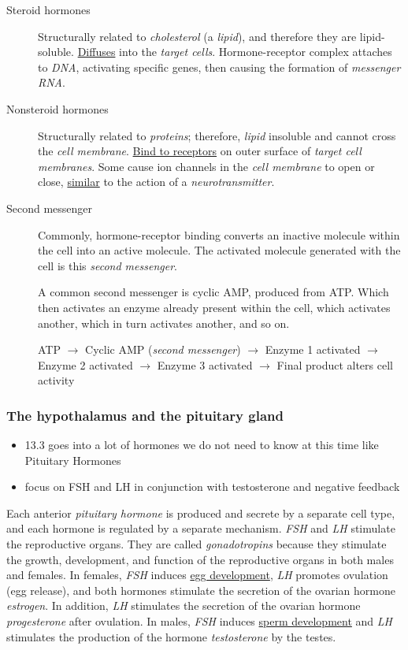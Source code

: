 \documentclass[11pt]{article}
\begin{document}
\begin{description}
\item[{Steroid hormones}] Structurally related to \emph{cholesterol} (a \emph{lipid}), and
therefore they are lipid-soluble. \uline{Diffuses} into the \emph{target cells}.
Hormone-receptor complex attaches to \emph{DNA}, activating specific genes, then
causing the formation of \emph{messenger RNA}.
\item[{Nonsteroid hormones}] Structurally related to \emph{proteins}; therefore, \emph{lipid}
insoluble and cannot cross the \emph{cell membrane}. \uline{Bind to receptors} on outer
surface of \emph{target cell membranes}. Some cause ion channels in the \emph{cell
membrane} to open or close, \uline{similar} to the action of a \emph{neurotransmitter}.
\item[{Second messenger}] Commonly, hormone-receptor binding converts an inactive
molecule within the cell into an active molecule. The activated molecule
generated with the cell is this \emph{second messenger}.

A common second messenger is cyclic AMP, produced from ATP. Which then
activates an enzyme already present within the cell, which activates
another, which in turn activates another, and so on.

ATP \(\rightarrow\) Cyclic AMP (\emph{second messenger}) \(\rightarrow\) Enzyme 1 activated
\(\rightarrow\) Enzyme 2 activated \(\rightarrow\) Enzyme 3 activated \(\rightarrow\) Final product alters cell
activity
\end{description}

\subsubsection{The hypothalamus and the pituitary gland}
\label{sec:org566cbaf}
\begin{itemize}
\item 13.3 goes into a lot of hormones we do not need to know at this time like
Pituitary Hormones
\item focus on FSH and LH in conjunction with testosterone and negative feedback
\end{itemize}

Each anterior \emph{pituitary hormone} is produced and secrete by a separate cell type,
and each hormone is regulated by a separate mechanism. \emph{FSH} and \emph{LH} stimulate the
reproductive organs. They are called \emph{gonadotropins} because they stimulate the
growth, development, and function of the reproductive organs in both males and
females. In females, \emph{FSH} induces \uline{egg development}, \emph{LH} promotes ovulation (egg
release), and both hormones stimulate the secretion of the ovarian hormone
\emph{estrogen}. In addition, \emph{LH} stimulates the secretion of the ovarian hormone
\emph{progesterone} after ovulation. In males, \emph{FSH} induces \uline{sperm development} and \emph{LH}
stimulates the production of the hormone \emph{testosterone} by the testes.
\end{document}
